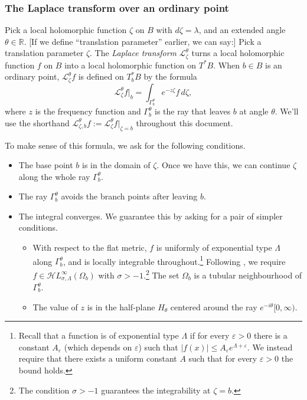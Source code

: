 \documentclass{article}
\newcommand{\singexp}[2]{\mathcal{H}L^\infty_{#1, #2}}
\newcommand{\R}{\mathbb{R}}
\newcommand{\laplace}{\mathcal{L}}
\theoremstyle{definition}
\theoremstyle{plain}
\begin{document}
\subsubsection{The Laplace transform over an ordinary point}\label{laplace:ordinary}
Pick a local holomorphic function $\zeta$ on $B$ with $d\zeta = \lambda$, and an extended angle $\theta \in \R$. \textcolor{VioletRed}{[If we define ``translation parameter'' earlier, we can say:] Pick a translation parameter $\zeta$.} The {\em Laplace transform} $\laplace_\zeta^\theta$ turns a local holomorphic function $f$ on $B$ into a local holomorphic function on $T^*B$. When $b \in B$ is an ordinary point, $\laplace_\zeta^\theta f$ is defined on $T_b^*B$ by the formula
\begin{equation}\label{laplace:int}
\laplace_{\zeta}^\theta f\big|_b = \int_{\Gamma_{b}^\theta} e^{-z\zeta} f\,d\zeta,
\end{equation}
where $z$ is the frequency function and $\Gamma_{b}^\theta$ is the ray that leaves $b$ at angle $\theta$. We’ll use the shorthand $\laplace_{\zeta, b}^\theta f := \laplace_\zeta^\theta f \big|_{\zeta = b}$ throughout this document.

To make sense of this formula, we ask for the following conditions.
\begin{itemize}
\item The base point $b$ is in the domain of $\zeta$. Once we have this, we can continue $\zeta$ along the whole ray $\Gamma_b^\theta$.
\item The ray $\Gamma_b^\theta$ avoids the branch points after leaving $b$.
\item The integral converges. We guarantee this by asking for a pair of simpler conditions.
\begin{itemize}
\item With respect to the flat metric, $f$ is uniformly of exponential type $\Lambda$ along $\Gamma_b^\theta$, and is locally integrable throughout.\footnote{Recall that a function is of exponential type $\Lambda$ if for every $\varepsilon>0$ there is a constant $A_\varepsilon$ (which depends on $\varepsilon$) such that $|f(x)|\leq A_\varepsilon e^{\Lambda+\varepsilon} $. We instead require that there exists a uniform constant $A$ such that for every $\varepsilon>0$ the bound holds.} Following \cite{reg-sing-volterra}, we require $f\in\singexp{\sigma}{\Lambda}(\Omega_b)$ with $\sigma>-1$.\footnote{The condition $\sigma>-1$ guarantees the integrability at $\zeta=b$.} The set $\Omega_b$ is a tubular neighbourhood of $\Gamma_b^\theta$. 
\item The value of $z$ is in the half-plane $H_{\theta}$ centered around the ray $e^{-i\theta} [0, \infty)$.
\end{itemize}
\end{itemize}
\color{black}
\end{document}
